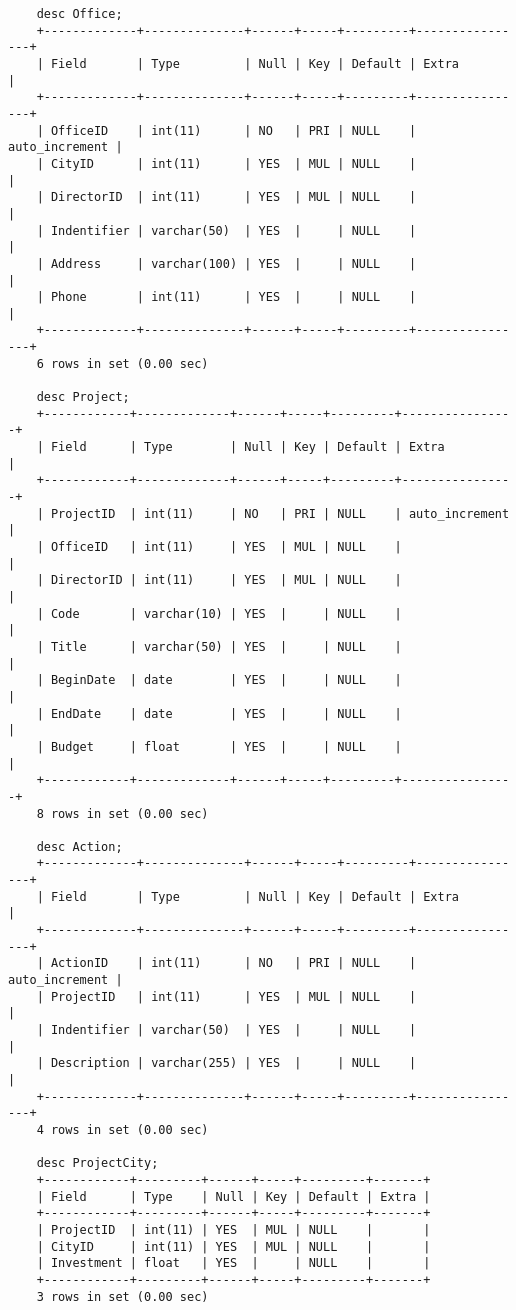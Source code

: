 \documentclass[13pt,a4paper]{report}
\begin{document}
\begin{itemize}
\begin{lstlisting}
	desc Office;
	+-------------+--------------+------+-----+---------+----------------+
	| Field       | Type         | Null | Key | Default | Extra          |
	+-------------+--------------+------+-----+---------+----------------+
	| OfficeID    | int(11)      | NO   | PRI | NULL    | auto_increment |
	| CityID      | int(11)      | YES  | MUL | NULL    |                |
	| DirectorID  | int(11)      | YES  | MUL | NULL    |                |
	| Indentifier | varchar(50)  | YES  |     | NULL    |                |
	| Address     | varchar(100) | YES  |     | NULL    |                |
	| Phone       | int(11)      | YES  |     | NULL    |                |
	+-------------+--------------+------+-----+---------+----------------+
	6 rows in set (0.00 sec)

	desc Project;
	+------------+-------------+------+-----+---------+----------------+
	| Field      | Type        | Null | Key | Default | Extra          |
	+------------+-------------+------+-----+---------+----------------+
	| ProjectID  | int(11)     | NO   | PRI | NULL    | auto_increment |
	| OfficeID   | int(11)     | YES  | MUL | NULL    |                |
	| DirectorID | int(11)     | YES  | MUL | NULL    |                |
	| Code       | varchar(10) | YES  |     | NULL    |                |
	| Title      | varchar(50) | YES  |     | NULL    |                |
	| BeginDate  | date        | YES  |     | NULL    |                |
	| EndDate    | date        | YES  |     | NULL    |                |
	| Budget     | float       | YES  |     | NULL    |                |
	+------------+-------------+------+-----+---------+----------------+
	8 rows in set (0.00 sec)

	desc Action;
	+-------------+--------------+------+-----+---------+----------------+
	| Field       | Type         | Null | Key | Default | Extra          |
	+-------------+--------------+------+-----+---------+----------------+
	| ActionID    | int(11)      | NO   | PRI | NULL    | auto_increment |
	| ProjectID   | int(11)      | YES  | MUL | NULL    |                |
	| Indentifier | varchar(50)  | YES  |     | NULL    |                |
	| Description | varchar(255) | YES  |     | NULL    |                |
	+-------------+--------------+------+-----+---------+----------------+
	4 rows in set (0.00 sec)

	desc ProjectCity;
	+------------+---------+------+-----+---------+-------+
	| Field      | Type    | Null | Key | Default | Extra |
	+------------+---------+------+-----+---------+-------+
	| ProjectID  | int(11) | YES  | MUL | NULL    |       |
	| CityID     | int(11) | YES  | MUL | NULL    |       |
	| Investment | float   | YES  |     | NULL    |       |
	+------------+---------+------+-----+---------+-------+
	3 rows in set (0.00 sec)


\end{lstlisting}
\end{itemize}
\end{document}
